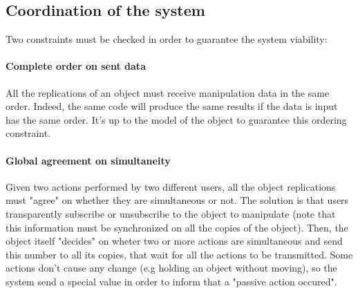 \documentclass[a4paper]{article}
\begin{document}
\subsection{Coordination of the system}
Two constraints must be checked in order to guarantee the system viability:

\paragraph{Complete order on sent data} All the replications of an object must receive manipulation data in the same order. Indeed, the same code will produce the same results if the data is input has the same order. It's up to the model of the object to guarantee this ordering constraint.

\paragraph{Global agreement on simultaneity} Given two actions performed by two different users, all the object replications must "agree" on whether they are simultaneous or not. The solution is that users transparently subscribe or unsubscribe to the object to manipulate (note that this information must be synchronized on all the copies of the object). Then, the object itself "decides" on wheter two or more actions are simultaneous and send this number to all its copies, that wait for all the actions to be transmitted. Some actions don't cause any change (e.g holding an object without moving), so the system send a special value in order to inform that a "passive action occured".
\end{document}
